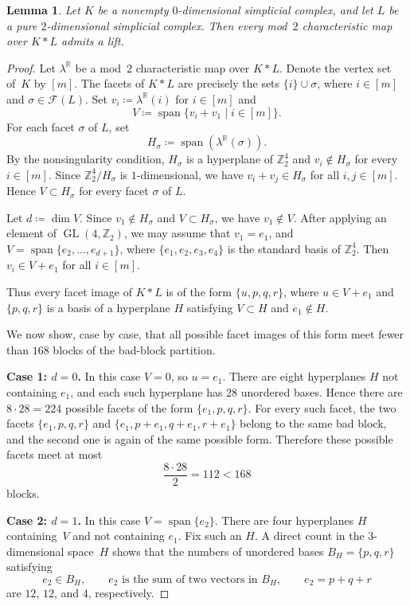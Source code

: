 \documentclass{amsart}
\newcommand{\Z}{\mathbb{Z}}
\newcommand{\R}{\mathbb{R}}
\newcommand{\cF}{\mathcal{F}}
\DeclareMathOperator{\GL}{GL}
\DeclareMathOperator{\Span}{span}
\newtheorem{lemma}[theorem]{Lemma}
\theoremstyle{definition}
\theoremstyle{remark}
\begin{document}
\begin{lemma}\label{lem:join-0-2}
    Let $K$ be a nonempty $0$-dimensional simplicial complex, and let $L$ be a pure $2$-dimensional simplicial complex.
    Then every mod~$2$ characteristic map over $K\ast L$ admits a lift.
\end{lemma}

\begin{proof}
    Let $\lambda^\R$ be a mod~$2$ characteristic map over $K\ast L$.
    Denote the vertex set of~$K$ by $[m]$.
    The facets of $K\ast L$ are precisely the sets $\{i\}\cup\sigma$, where $i\in[m]$ and $\sigma\in\cF(L)$.
    Set $v_i\coloneq\lambda^\R(i)$ for $i\in[m]$ and 
    $$
        V\coloneq\Span\{v_i+v_1\mid i\in[m]\}.
    $$
    For each facet $\sigma$ of $L$, set
    $$
        H_\sigma\coloneq\Span(\lambda^\R(\sigma)).
    $$
    By the nonsingularity condition, $H_\sigma$ is a hyperplane of $\Z_2^4$ and $v_i\notin H_\sigma$ for every~$i\in[m]$.
    Since $\Z_2^4/H_\sigma$ is $1$-dimensional, we have $v_i+v_j\in H_\sigma$ for all $i,j\in[m]$.
    Hence $V\subset H_\sigma$ for every facet $\sigma$ of $L$.

    Let $d\coloneq\dim V$.
    Since $v_1\notin H_\sigma$ and $V\subset H_\sigma$, we have $v_1\notin V$.
    After applying an element of $\GL(4,\Z_2)$, we may assume that $v_1=e_1$, and $V=\Span\{e_2,\ldots,e_{d+1}\}$, where $\{e_1,e_2,e_3,e_4\}$ is the standard basis of $\Z_2^4$.
    Then $v_i\in V+e_1$ for all $i\in[m]$.

    Thus every facet image of $K\ast L$ is of the form $\{u,p,q,r\}$, where $u\in V+e_1$ and $\{p,q,r\}$ is a basis of a hyperplane $H$ satisfying $V\subset H$ and $e_1\notin H$.
    
    We now show, case by case, that all possible facet images of this form meet fewer than $168$ blocks of the bad-block partition.

    \noindent\textsf{\textbf{Case 1: $d=0$.}}
    In this case $V=0$, so $u=e_1$.
    There are eight hyperplanes $H$ not containing $e_1$, and each such hyperplane has $28$ unordered bases.
    Hence there are $8\cdot28=224$ possible facets of the form $\{e_1,p,q,r\}$.
    For every such facet, the two facets $\{e_1,p,q,r\}$ and $\{e_1,p+e_1,q+e_1,r+e_1\}$ belong to the same bad block, and the second one is again of the same possible form.
    Therefore these possible facets meet at most
    $$
        \frac{8\cdot28}{2}=112<168
    $$
    blocks.

    \noindent\textsf{\textbf{Case 2: $d=1$.}}
    In this case $V=\Span\{e_2\}$.
    There are four hyperplanes $H$ containing~$V$ and not containing $e_1$.
    Fix such an $H$.
    A direct count in the $3$-dimensional space~$H$ shows that the numbers of unordered bases $B_H=\{p,q,r\}$ satisfying 
    $$
        e_2\in B_H, \qquad e_2\text{ is the sum of two vectors in }B_H, \qquad e_2=p+q+r
    $$
    are $12$, $12$, and $4$, respectively.


\end{proof}
\end{document}
